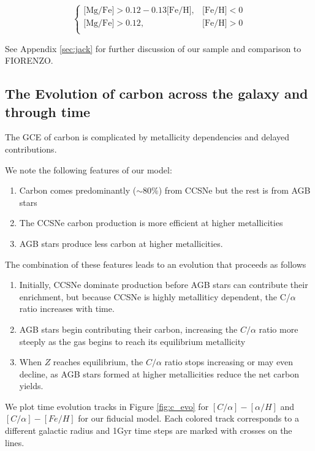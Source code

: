 \documentclass[fleqn,usenatbib]{mnras}
\begin{document}
\begin{equation}
\begin{cases}
\text{[Mg/Fe]} >0.12-0.13\text{[Fe/H]}, & \text{[Fe/H]}<0\\
\text{[Mg/Fe]} >0.12, & \text{[Fe/H]}>0\\
\end{cases}
\end{equation}


See Appendix \ref{sec:jack} for further discussion of our sample and comparison to FIORENZO.


\subsection{The Evolution of carbon across the galaxy and through time}

The GCE of carbon is complicated by metallicity dependencies and delayed contributions. 

We note the following features of our model:

\begin{enumerate}
    \item Carbon comes predominantly ($\sim80\%$) from CCSNe but the rest is from AGB stars
    \item The CCSNe carbon production is more efficient at higher metallicities
    \item AGB stars produce less carbon at higher metallicities.
\end{enumerate}


The combination of these features leads to an evolution that proceeds as follows
\begin{enumerate}
    \item Initially, CCSNe dominate production before AGB stars can contribute their enrichment, but because CCSNe is highly metalliticy dependent, the C/$\alpha$ ratio increases with time.
    \item AGB stars begin contributing their carbon, increasing the $C/\alpha$ ratio more steeply as the gas begins to reach its equilibrium metallicity
    \item When $Z$ reaches equilibrium, the $C/\alpha$ ratio stops increasing or may even decline, as AGB stars formed at higher metallicities reduce the net carbon yields.
\end{enumerate}

We plot time evolution tracks in Figure \ref{fig:c_evo} for $[C/\alpha]-[\alpha/H]$ and $[C/\alpha]-[Fe/H]$ for our fiducial model. Each colored track corresponds to a different galactic radius and 1Gyr time steps are marked with crosses on the lines. 
\end{document}
